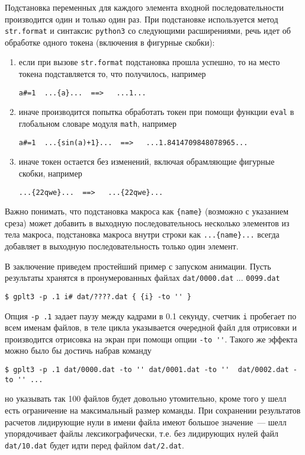 \documentclass[12pt]{article}
\def\python{{\tt python3}}
\begin{document}
Подстановка переменных для каждого элемента входной последовательности производится один и только один раз.
При подстановке используется метод \verb'str.format' и синтаксис \python{} со следующими расширениями, речь идет об обработке одного токена (включения в фигурные скобки):
\begin{enumerate}
\item если при вызове \verb'str.format' подстановка прошла успешно, то на место токена подставляется то, что получилось, например
\begin{verbatim}
a#=1  ...{a}...  ==>   ...1...
\end{verbatim}
\item иначе производится попытка обработать токен при помощи функции \verb'eval' в глобальном словаре модуля \verb'math', например
\begin{verbatim}
a#=1  ...{sin(a)+1}...  ==>   ...1.8414709848078965...
\end{verbatim}  
\item иначе токен остается без изменений, включая обрамляющие фигурные скобки, например
\begin{verbatim}
...{22qwe}...  ==>   ...{22qwe}...
\end{verbatim}    
\end{enumerate}
Важно понимать, что подстановка макроса  как \verb'{name}' (возможно с указанием среза) может добавить в выходную последовательнось
несколько элементов из тела макроса, подстановка макроса внутри строки как \verb'...{name}...' всегда добавляет в выходную последовательность только один элемент.

В заключение приведем простейший пример с запуском анимации. Пусть результаты хранятся в пронумерованных файлах \verb'dat/0000.dat' ... \verb'0099.dat'
\begin{verbatim}
$ gplt3 -p .1 i# dat/????.dat { {i} -to '' }
\end{verbatim}
Опция \verb'-p .1' задает паузу между кадрами в 0.1 секунду, счетчик \verb'i' пробегает по всем именам файлов, в теле цикла указывается очередной файл
для отрисовки и производится отрисовка на экран при помощи опции \verb|-to ''|. Такого же эффекта можно было бы достичь набрав команду
\begin{verbatim}
$ gplt3 -p .1 dat/0000.dat -to '' dat/0001.dat -to ''  dat/0002.dat -to '' ...
\end{verbatim}
но указывать так 100 файлов будет довольно утомительно, кроме того у шелл есть ограничение на максимальный размер команды.
При сохранении результатов расчетов лидирующие нули в имени файла имеют большое значение~--- шелл упорядочивает файлы лексикографически, т.е. без лидирующих нулей
файл \verb'dat/10.dat' будет идти перед файлом \verb'dat/2.dat'.
\end{document}
